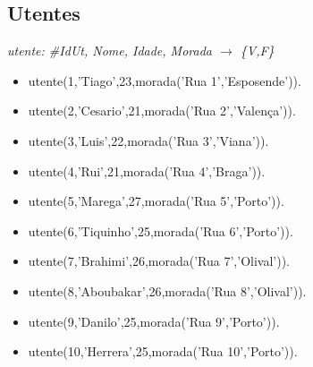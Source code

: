 \documentclass[a4paper]{report} %
\begin{document}
\subsection{Utentes}
\textit{utente: \#IdUt, Nome, Idade, Morada $\rightarrow$ \{V,F\}}
\begin{itemize}
\item utente(1,'Tiago',23,morada('Rua 1','Esposende')).
\item utente(2,'Cesario',21,morada('Rua 2','Valença')).
\item utente(3,'Luis',22,morada('Rua 3','Viana')).
\item utente(4,'Rui',21,morada('Rua 4','Braga')).
\item utente(5,'Marega',27,morada('Rua 5','Porto')).
\item utente(6,'Tiquinho',25,morada('Rua 6','Porto')).
\item utente(7,'Brahimi',26,morada('Rua 7','Olival')).
\item utente(8,'Aboubakar',26,morada('Rua 8','Olival')).
\item utente(9,'Danilo',25,morada('Rua 9','Porto')).
\item utente(10,'Herrera',25,morada('Rua 10','Porto')).
\end{itemize}
\end{document}
